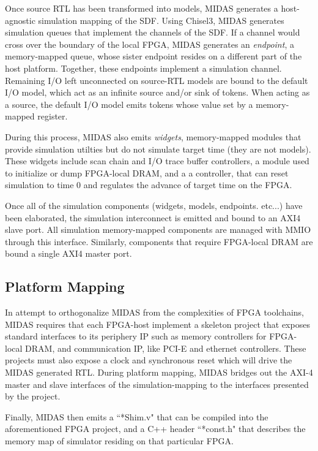 Once source RTL has been transformed into models, MIDAS generates a
host-agnostic simulation mapping of the SDF. Using Chisel3, MIDAS generates
simulation queues that implement the channels of the SDF. If a channel would
cross over the boundary of the local FPGA, MIDAS generates an \emph{endpoint},
a memory-mapped queue, whose sister endpoint resides on a different part of the
host platform.  Together, these endpoints implement a simulation channel.
Remaining I/O left unconnected on source-RTL models are bound to the default
I/O model, which act as an infinite source and/or sink of tokens.  When acting
as a source, the default I/O model emits tokens whose value set by a
memory-mapped register.

During this process, MIDAS also emits \emph{widgets}, memory-mapped modules
that provide simulation utilties but do not simulate target time (they are not
models). These widgets include scan chain and I/O trace buffer controllers, a
module used to initialize or dump FPGA-local DRAM, and a a controller, that can
reset simulation to time 0 and regulates the advance of target time on the
FPGA.

Once all of the simulation components (widgets, models, endpoints. etc...) have
been elaborated, the simulation interconnect is emitted and bound to an AXI4
slave port. All simulation memory-mapped components are managed with MMIO
through this interface. Similarly, components that require FPGA-local DRAM are
bound a single AXI4 master port.

\subsection{Platform Mapping}

In attempt to orthogonalize MIDAS from the complexities of FPGA toolchains,
MIDAS requires that each FPGA-host implement a skeleton project that exposes
standard interfaces to its periphery IP such as memory controllers for
FPGA-local DRAM, and communication IP, like PCI-E and ethernet controllers.
These projects must also expose a clock and synchronous reset which will drive
the MIDAS generated RTL.  During platform mapping, MIDAS bridges out the AXI-4
master and slave interfaces of the simulation-mapping to the interfaces
presented by the project.

Finally, MIDAS then emits a ``*Shim.v" that can be compiled into the
aforementioned FPGA project, and a C++ header ``*const.h" that describes the
memory map of simulator residing on that particular FPGA.

